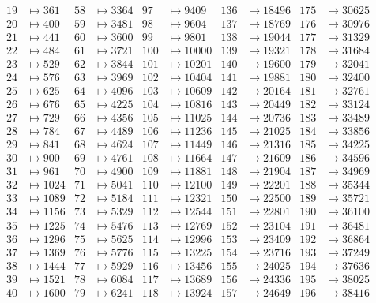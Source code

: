 \begin{align*}
 19&\mapsto 361    &  58&\mapsto 3364   &  97&\mapsto 9409   & 136&\mapsto 18496  & 175&\mapsto 30625 \\
 20&\mapsto 400    &  59&\mapsto 3481   &  98&\mapsto 9604   & 137&\mapsto 18769  & 176&\mapsto 30976 \\
 21&\mapsto 441    &  60&\mapsto 3600   &  99&\mapsto 9801   & 138&\mapsto 19044  & 177&\mapsto 31329 \\
 22&\mapsto 484    &  61&\mapsto 3721   & 100&\mapsto 10000  & 139&\mapsto 19321  & 178&\mapsto 31684 \\
 23&\mapsto 529    &  62&\mapsto 3844   & 101&\mapsto 10201  & 140&\mapsto 19600  & 179&\mapsto 32041 \\
 24&\mapsto 576    &  63&\mapsto 3969   & 102&\mapsto 10404  & 141&\mapsto 19881  & 180&\mapsto 32400 \\
 25&\mapsto 625    &  64&\mapsto 4096   & 103&\mapsto 10609  & 142&\mapsto 20164  & 181&\mapsto 32761 \\
 26&\mapsto 676    &  65&\mapsto 4225   & 104&\mapsto 10816  & 143&\mapsto 20449  & 182&\mapsto 33124 \\
 27&\mapsto 729    &  66&\mapsto 4356   & 105&\mapsto 11025  & 144&\mapsto 20736  & 183&\mapsto 33489 \\
 28&\mapsto 784    &  67&\mapsto 4489   & 106&\mapsto 11236  & 145&\mapsto 21025  & 184&\mapsto 33856 \\
 29&\mapsto 841    &  68&\mapsto 4624   & 107&\mapsto 11449  & 146&\mapsto 21316  & 185&\mapsto 34225 \\
 30&\mapsto 900    &  69&\mapsto 4761   & 108&\mapsto 11664  & 147&\mapsto 21609  & 186&\mapsto 34596 \\
 31&\mapsto 961    &  70&\mapsto 4900   & 109&\mapsto 11881  & 148&\mapsto 21904  & 187&\mapsto 34969 \\
 32&\mapsto 1024   &  71&\mapsto 5041   & 110&\mapsto 12100  & 149&\mapsto 22201  & 188&\mapsto 35344 \\
 33&\mapsto 1089   &  72&\mapsto 5184   & 111&\mapsto 12321  & 150&\mapsto 22500  & 189&\mapsto 35721 \\
 34&\mapsto 1156   &  73&\mapsto 5329   & 112&\mapsto 12544  & 151&\mapsto 22801  & 190&\mapsto 36100 \\
 35&\mapsto 1225   &  74&\mapsto 5476   & 113&\mapsto 12769  & 152&\mapsto 23104  & 191&\mapsto 36481 \\
 36&\mapsto 1296   &  75&\mapsto 5625   & 114&\mapsto 12996  & 153&\mapsto 23409  & 192&\mapsto 36864 \\
 37&\mapsto 1369   &  76&\mapsto 5776   & 115&\mapsto 13225  & 154&\mapsto 23716  & 193&\mapsto 37249 \\
 38&\mapsto 1444   &  77&\mapsto 5929   & 116&\mapsto 13456  & 155&\mapsto 24025  & 194&\mapsto 37636 \\
 39&\mapsto 1521   &  78&\mapsto 6084   & 117&\mapsto 13689  & 156&\mapsto 24336  & 195&\mapsto 38025 \\
 40&\mapsto 1600   &  79&\mapsto 6241   & 118&\mapsto 13924  & 157&\mapsto 24649  & 196&\mapsto 38416
\end{align*}


